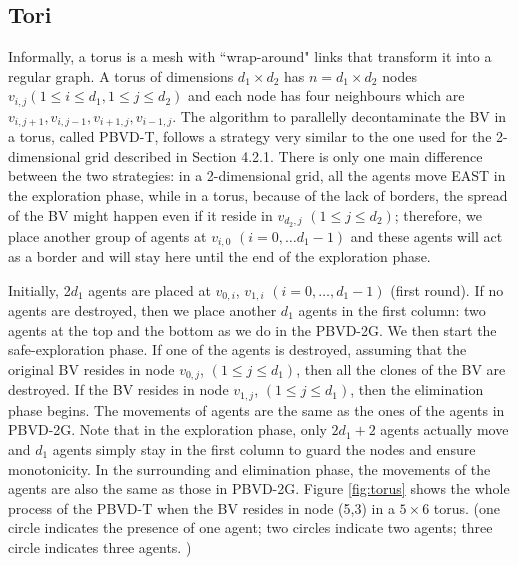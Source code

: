 \subsection{Tori}
Informally, a torus is a mesh with ``wrap-around" links that transform it into a regular graph. A torus of dimensions $d_1\times d_2$ has $n=d_1\times d_2$ nodes $v_{i,j} (1\leq i\leq d_1, 1\leq j\leq d_2)$ and each node has four neighbours which are $v_{i,j+1}, v_{i,j-1}, v_{i+1,j}, v_{i-1,j}$. The algorithm to parallelly decontaminate the BV in a torus, called PBVD-T, follows a strategy very similar to the one used for the 2-dimensional grid described in Section 4.2.1. There is only one main difference between the two strategies: in  a 2-dimensional grid, all the agents move EAST in the exploration phase, while in a torus, because of the lack of borders, the spread of the BV might happen even if it reside in $v_{d_2, j}$ $(1\leq j\leq d_2)$; therefore, we place another group of agents at $v_{i,0}$ $(i=0,\ldots d_1-1)$ and these agents will act as a border and will stay here until the end of the  exploration phase. 

Initially, 2$d_1$ agents are placed at $v_{0,i}$, $v_{1,i}$ $(i=0,\ldots,d_1-1)$ (first round). If no agents are destroyed, then we place another $d_1$ agents in the first column: two agents at the top and the bottom  as we do in the PBVD-2G. We then start the safe-exploration phase. If one of the agents is destroyed, assuming that the original BV resides in node $v_{0,j}$, $(1\leq j\leq d_1)$, then all the clones of the BV are destroyed. If the BV resides in node $v_{1,j}$, $(1\leq j\leq d_1)$, then the elimination phase begins. The movements of agents are the same as the ones of the agents in PBVD-2G. Note that in the exploration phase, only $2d_1+2$ agents actually move and $d_1$ agents simply stay in the first column to guard the nodes and ensure    monotonicity. In the surrounding and elimination phase, the movements of the agents are also the same as those in PBVD-2G. Figure \ref{fig:torus} shows the whole process of the PBVD-T when the BV resides in node (5,3) in a $5\times6$ torus. (one circle indicates the presence of one agent;  two circles  indicate    two agents;  three circle  indicates  three agents. )

